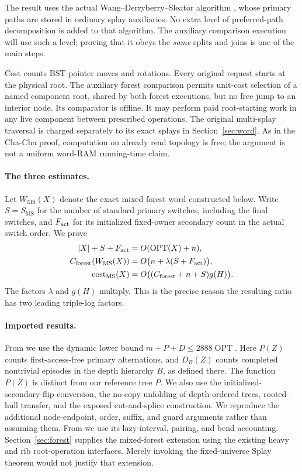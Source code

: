 \documentclass[11pt]{article}
\numberwithin{equation}{section}
\newcommand{\cost}{\operatorname{cost}}
\newcommand{\OPT}{\operatorname{OPT}}
\newcommand{\MS}{\mathrm{MS}}
\begin{document}
The result uses the actual Wang--Derryberry--Sleator algorithm
\cite{MST,Wang}, whose primary paths are stored in ordinary splay
auxiliaries. No extra level of preferred-path decomposition is added
to that algorithm. The auxiliary comparison execution will use such
a level; proving that it obeys the \emph{same} splits and joins is
one of the main steps.

Cost counts BST pointer moves and rotations. Every original request
starts at the physical root. The auxiliary forest comparison permits
unit-cost selection of a named component root, shared by both forest
executions, but no free jump to an interior node. Its comparator is
offline. It may perform paid root-starting work in any live component
between prescribed operations. The original multi-splay traversal is
charged separately to its exact splays in Section~\ref{sec:word}.
As in the Cha-Cha proof, computation on already read topology
is free; the argument is not a uniform word-RAM running-time claim.

\paragraph{The three estimates.}
Let $W_{\MS}(X)$ denote the exact mixed forest word constructed below.
Write $S=S_{\MS}$ for the number of standard primary switches, including
the final switches, and $F_{\rm act}$ for its initialized fixed-owner
secondary count in the actual switch order. We prove
\begin{align}
 |X|+S+F_{\rm act}&=O(\OPT(X)+n),                 \label{eq:route-counter}\\
 C_{\rm forest}(W_{\MS}(X))
   &=O\bigl(n+\lambda(S+F_{\rm act})\bigr),     \label{eq:route-comparator}\\
 \cost_{\MS}(X)
   &=O\bigl((C_{\rm forest}+n+S)g(H)\bigr).     \label{eq:route-splay}
\end{align}
The factors $\lambda$ and $g(H)$ multiply. This is the precise reason
the resulting ratio has two leading triple-log factors.

\paragraph{Imported results.}
From \cite{ChaCha} we use the dynamic lower bound
$m+P+D\le2888\OPT$. Here $P(Z)$ counts first-access-free primary
alternations, and $D_B(Z)$ counts completed nontrivial episodes in
the depth hierarchy $B$, as defined there. The function $P(Z)$ is
distinct from our reference tree $P$. We also use the
initialized-secondary-flip conversion,
the no-copy unfolding of depth-ordered trees, rooted-hull transfer,
and the exposed cut-and-splice construction. We reproduce the
additional node-endpoint, order, suffix, and guard arguments rather
than assuming them. From \cite{Splay} we use its lazy-interval,
pairing, and bend accounting. Section~\ref{sec:forest} supplies the
mixed-forest extension using the existing heavy and rib root-operation
interfaces. Merely invoking the fixed-universe Splay theorem would
not justify that extension.
\end{document}
